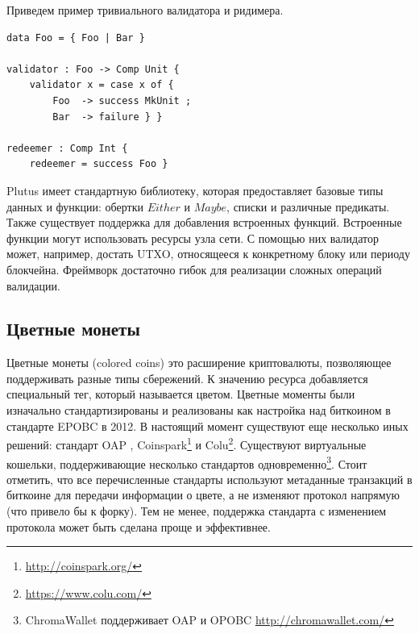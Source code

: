 \documentclass[specification,annotation]{itmo-student-thesis}
\begin{document}
Приведем пример тривиального валидатора и ридимера.

\begin{lstlisting}[float=!h,caption={Пример пары валидатор/ридимер на Plutus}]
data Foo = { Foo | Bar }

validator : Foo -> Comp Unit {
    validator x = case x of {
        Foo  -> success MkUnit ;
        Bar  -> failure } }

redeemer : Comp Int {
    redeemer = success Foo }
\end{lstlisting}

Plutus имеет стандартную библиотеку, которая предоставляет базовые
типы данных и функции: обертки $Either$ и $Maybe$, списки и различные
предикаты. Также существует поддержка для добавления встроенных
функций. Встроенные функции могут использовать ресурсы узла сети. С
помощью них валидатор может, например, достать UTXO, относящееся к
конкретному блоку или периоду блокчейна. Фреймворк достаточно гибок
для реализации сложных операций валидации.

\subsection{Цветные монеты}

Цветные монеты (colored coins) это расширение криптовалюты,
позволяющее поддерживать разные типы сбережений. К значению ресурса
добавляется специальный тег, который называется цветом. Цветные
моменты были изначально стандартизированы и реализованы как настройка
над биткоином в стандарте EPOBC \cite{epobc} в 2012. В настоящий
момент существуют еще несколько иных решений: стандарт OAP \cite{oap},
Coinspark\footnote{\url{http://coinspark.org/}} и
Colu\footnote{\url{https://www.colu.com/}}. Существуют виртуальные
кошельки, поддерживающие несколько стандартов
одновременно\footnote{ChromaWallet поддерживает OAP и OPOBC
  \url{http://chromawallet.com/}}. Стоит отметить, что все
перечисленные стандарты используют метаданные транзакций в биткоине
для передачи информации о цвете, а не изменяют протокол напрямую (что
привело бы к форку). Тем не менее, поддержка стандарта с изменением
протокола может быть сделана проще и эффективнее.
\end{document}
